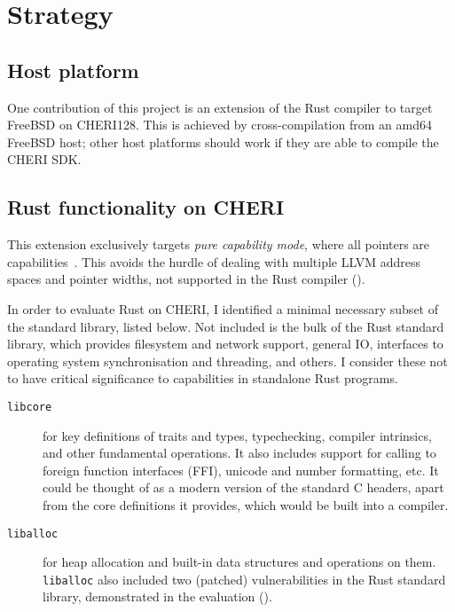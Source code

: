 \documentclass[dissertation.tex]{subfiles}
\begin{document}
\section{Strategy}
\label{sec:impl-what}

\subsection{Host platform}
One contribution of this project is an extension of the Rust compiler to
target FreeBSD on CHERI128.
This is achieved by cross-compilation from an amd64 FreeBSD host; other
host platforms should work if they are able to compile the CHERI SDK.

\subsection{Rust functionality on CHERI}
This extension exclusively targets \emph{pure capability mode}, where
all pointers are capabilities~\cite{cheri-prog-guide}.
This avoids the hurdle of dealing with multiple LLVM address spaces and
pointer widths, not supported in the Rust compiler
().

In order to evaluate Rust on CHERI, I identified
a minimal necessary subset of the standard library, listed below.
Not included is the bulk of the Rust standard library, which provides
filesystem and network support, general IO, interfaces to operating
system synchronisation and threading, and others.
I consider these not to have critical significance to capabilities in
standalone Rust programs.

\begin{description}
    \item[\texttt{libcore}] for key definitions of traits and types,
    typechecking, compiler intrinsics, and other fundamental operations.
    It also includes support for calling to foreign function interfaces
    (FFI), unicode and number formatting, etc.
    It could be thought of as a modern version of the standard C
    headers, apart from the core definitions it provides, which would be
    built into a compiler.
    \item[\texttt{liballoc}] for heap allocation and built-in data
    structures and operations on them.
    \texttt{liballoc} also included two (patched) vulnerabilities in the
    Rust standard library, demonstrated in the evaluation
    ().
\end{description}
\end{document}
